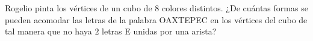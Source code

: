 Rogelio pinta los vértices de un cubo de $8$ colores distintos. ¿De cuántas formas se pueden acomodar las letras de la palabra OAXTEPEC en los vértices del cubo de tal manera que no haya $2$ letras E unidas por una arista?